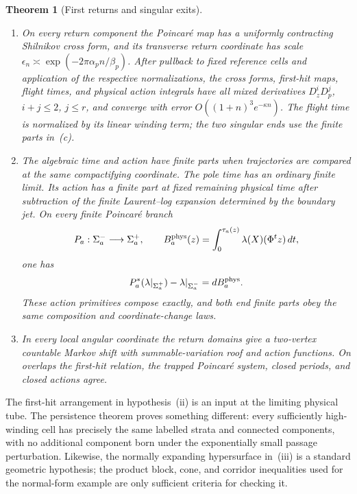 \documentclass[11pt]{amsart}
\numberwithin{equation}{section}
\newtheorem{theorem}{Theorem}[section]
\theoremstyle{definition}
\theoremstyle{remark}
\begin{document}
\begin{theorem}[First returns and singular exits]
\begin{enumerate}
\item On every return component the Poincar\'e map has a uniformly
contracting Shilnikov cross form, and its transverse return coordinate has
scale $\epsilon_n\asymp\exp(-2\pi\alpha_p n/\beta_p)$.  After pullback to
fixed reference cells and application of the respective normalizations,
the cross forms, first-hit maps, flight times, and physical action
integrals have all mixed derivatives $D_z^iD_p^j$, $i+j\le2$, $j\le r$,
and converge with error $O((1+n)^3e^{-\kappa n})$.  The flight time is
normalized by its linear winding term; the two singular ends use the
finite parts in~\textup{(c)}.

\item The algebraic time and action have finite parts when trajectories are
compared at the same compactifying coordinate.  The pole time has an
ordinary finite limit.  Its action has a finite part at fixed remaining
physical time after subtraction of the finite Laurent--log expansion
determined by the boundary jet.  On
every finite Poincar\'e branch
\[
 P_a:\Sigma_a^-\longrightarrow\Sigma_a^+,
 \qquad
 B_a^{\rm phys}(z)=
 \int_0^{\tau_a(z)}\lambda(X)(\Phi^t z)\,dt,
\]
one has
\[
 P_a^*(\lambda|_{\Sigma_a^+})-\lambda|_{\Sigma_a^-}
 =dB_a^{\rm phys}.
\]
These action primitives compose exactly, and both end finite parts obey
the same composition and coordinate-change laws.

\item In every local angular coordinate the return domains give a
two-vertex countable Markov shift with summable-variation roof and action
functions.  On overlaps the first-hit relation, the trapped Poincar\'e
system, closed periods, and closed actions agree.
\end{enumerate}
\end{theorem}

The first-hit arrangement in hypothesis~\textup{(ii)} is an input at the
limiting physical tube.  The persistence theorem proves something
different: every sufficiently high-winding cell has precisely the same
labelled strata and connected components, with no additional component born
under the exponentially small passage perturbation.  Likewise, the
normally expanding hypersurface in~\textup{(iii)} is a standard geometric
hypothesis; the product block, cone, and corridor inequalities used for
the normal-form example are only sufficient criteria for checking it.
\end{document}
